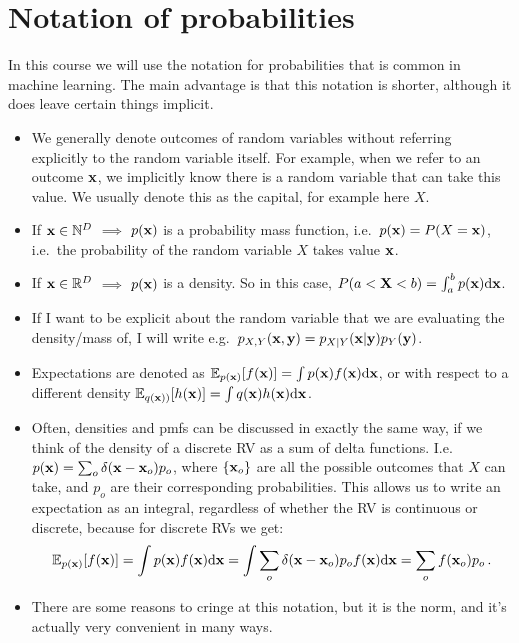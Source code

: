 \documentclass[a4paper]{article}
\theoremstyle{definition}
\begin{document}
\section{Notation of probabilities}
In this course we will use the notation for probabilities that is common in machine learning. The main advantage is that this notation is shorter, although it does leave certain things implicit.
\begin{itemize}
\item We generally denote outcomes of random variables without referring explicitly to the random variable itself. For example, when we refer to an outcome $\mathbf{x}$, we implicitly know there is a random variable that can take this value. We usually denote this as the capital, for example here $X$.
\item If $\mathbf{x} \in \mathbb N^D$ $\implies$ $p(\mathbf{x})$ is a probability mass function, i.e.~$p(\mathbf{x}) = P(X = \mathbf{x})$, i.e.~the probability of the random variable $X$ takes value $\mathbf{x}$.
\item If $\mathbf{x} \in \mathbb{R}^D$ $\implies$ $p(\mathbf{x})$ is a density. So in this case, $P(a < \mathbf X < b) = \int_a^b p(\mathbf{x}) \mathrm{d}\mathbf{x}$.
\item If I want to be explicit about the random variable that we are evaluating the density/mass of, I will write e.g.~$p_{X,Y}(\mathbf{x},\mathbf{y}) = p_{X|Y}(\mathbf{x}|\mathbf{y})p_Y(\mathbf{y})$.
\item Expectations are denoted as $\Exp{p(\vx)}{f(\vx)} = \int p(\vx) f(\vx) \calcd\vx$, or with respect to a different density $\Exp{q(\vx))}{h(\vx)} = \int q(\vx) h(\vx) \calcd{\vx}$.
\item Often, densities and pmfs can be discussed in exactly the same way, if we think of the density of a discrete RV as a sum of delta functions. I.e.~$p(\mathbf{x}) = \sum_{o} \delta(\mathbf{x} - \mathbf{x}_o) p_o$, where $\{\mathbf{x}_o\}$ are all the possible outcomes that $X$ can take, and $p_o$ are their corresponding probabilities. This allows us to write an expectation as an integral, regardless of whether the RV is continuous or discrete, because for discrete RVs we get:
\begin{align}
\Exp{p(\vx)}{f(\vx)} = \int p(\vx) f(\vx) \calcd\vx = \int \sum_o \delta(\vx - \vx_o) p_o f(\vx) \calcd\vx = \sum_o f(\vx_o)p_o \,.
\end{align}
\item There are some reasons to cringe at this notation, but it is the norm, and it's actually very convenient in many ways.
\end{itemize}
\end{document}
